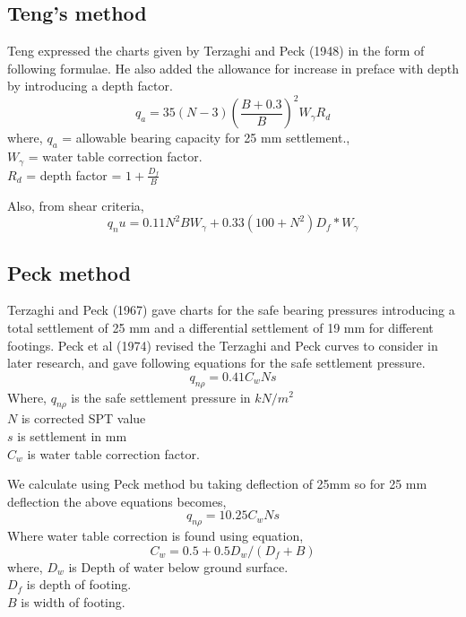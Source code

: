 \subsection{Teng's method}
Teng expressed the charts given by Terzaghi and Peck (1948) in the form of following formulae. He also added the allowance for increase in preface with depth by introducing a depth factor.
\begin{equation}
q_a = 35 (N-3) (\frac{B+0.3}{B})^2 W_\gamma R_d
\end{equation}
where,
$q_a$ = allowable bearing capacity for 25 mm settlement.,\\
$W_\gamma$ = water table correction factor.\\
$R_d$ = depth factor = $1 + \frac{D_f}{B}$

Also, from shear criteria,
\begin{equation}
q_nu = 0.11 N^2 B {W_\gamma} + 0.33 (100+N^2)D_f*{W_\gamma}
\end{equation}

\subsection{Peck method}
Terzaghi and Peck (1967) gave charts for the safe bearing pressures introducing a total settlement of 25 mm and a differential settlement of 19 mm for different footings. Peck et al (1974) revised the Terzaghi and Peck curves to consider in later research, and gave following equations for the safe settlement pressure.\cite{arora_soil_2004}
\begin{equation}
q_{n\rho} = 0.41 C_w Ns
\end{equation}
Where,
 $q_{n\rho}$ is the safe settlement pressure in $kN/m^2$\\
 $N$ is corrected SPT value\\
 $s$ is settlement in mm\\
 $C_w$ is water table correction factor.
 
We calculate using Peck method bu taking deflection of 25mm so for 25 mm deflection the above equations becomes,
\begin{equation}
q_{n\rho} = 10.25 C_w Ns
\end{equation}
Where water table correction is found using equation,
\begin{equation}
C_w=0.5+0.5 D_w / (D_f + B)
\end{equation}
where,
$D_w$ is Depth of water below ground surface.\\
$D_f$  is depth of footing.\\
$B$ is width of footing.


